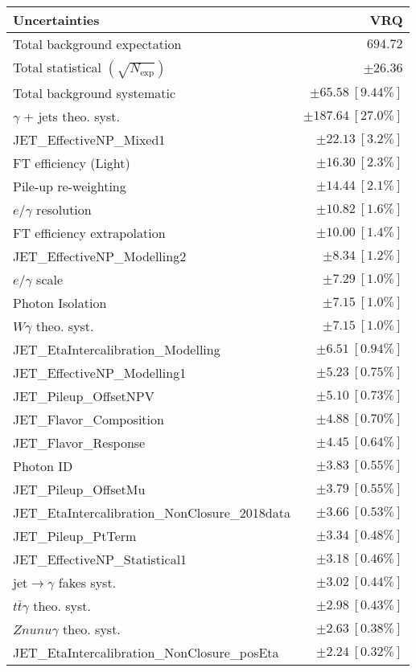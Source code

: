 \begin{tabular}{lr}
\hline
\textbf{Uncertainties} & \textbf{VRQ} \\
\hline
Total background expectation & $694.72$ \\
\hline
Total statistical $(\sqrt{N_\mathrm{exp}})$ & $\pm 26.36$ \\
Total background systematic & $\pm 65.58\ [9.44\%]$ \\
\hline
\hline
$\gamma$ + jets theo. syst. & $\pm 187.64\ [27.0\%]$ \\
JET\_EffectiveNP\_Mixed1 & $\pm 22.13\ [3.2\%]$ \\
FT efficiency (Light) & $\pm 16.30\ [2.3\%]$ \\
Pile-up re-weighting & $\pm 14.44\ [2.1\%]$ \\
$e/\gamma$ resolution & $\pm 10.82\ [1.6\%]$ \\
FT efficiency extrapolation & $\pm 10.00\ [1.4\%]$ \\
JET\_EffectiveNP\_Modelling2 & $\pm 8.34\ [1.2\%]$ \\
$e/\gamma$ scale & $\pm 7.29\ [1.0\%]$ \\
Photon Isolation & $\pm 7.15\ [1.0\%]$ \\
$W\gamma$ theo. syst. & $\pm 7.15\ [1.0\%]$ \\
JET\_EtaIntercalibration\_Modelling & $\pm 6.51\ [0.94\%]$ \\
JET\_EffectiveNP\_Modelling1 & $\pm 5.23\ [0.75\%]$ \\
JET\_Pileup\_OffsetNPV & $\pm 5.10\ [0.73\%]$ \\
JET\_Flavor\_Composition & $\pm 4.88\ [0.70\%]$ \\
JET\_Flavor\_Response & $\pm 4.45\ [0.64\%]$ \\
Photon ID & $\pm 3.83\ [0.55\%]$ \\
JET\_Pileup\_OffsetMu & $\pm 3.79\ [0.55\%]$ \\
JET\_EtaIntercalibration\_NonClosure\_2018data & $\pm 3.66\ [0.53\%]$ \\
JET\_Pileup\_PtTerm & $\pm 3.34\ [0.48\%]$ \\
JET\_EffectiveNP\_Statistical1 & $\pm 3.18\ [0.46\%]$ \\
jet$\to\gamma$ fakes syst. & $\pm 3.02\ [0.44\%]$ \\
$t\bar{t}\gamma$ theo. syst. & $\pm 2.98\ [0.43\%]$ \\
$Znunu\gamma$ theo. syst. & $\pm 2.63\ [0.38\%]$ \\
JET\_EtaIntercalibration\_NonClosure\_posEta & $\pm 2.24\ [0.32\%]$ \\

\end{tabular}
